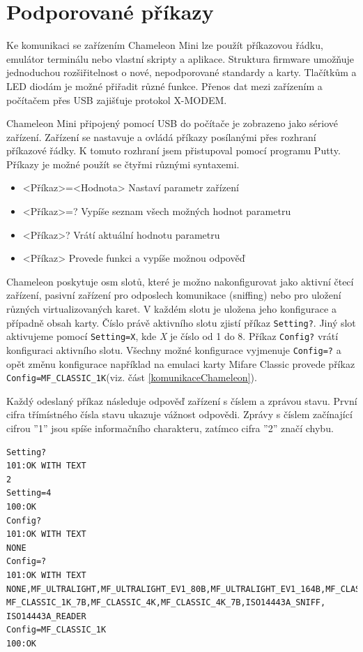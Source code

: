 \section{Podporované příkazy}
Ke komunikaci se zařízením Chameleon Mini lze použít příkazovou řádku, emulátor terminálu nebo vlastní skripty a aplikace. Struktura firmware umožňuje jednoduchou rozšiřitelnost o nové, nepodporované standardy a karty. Tlačítkům a LED diodám je možné přiřadit různé funkce. Přenos dat mezi zařízením a počítačem přes USB zajišťuje protokol {X-MODEM}. \cite{ChameleonKickStarter}
\par
Chameleon Mini připojený pomocí USB do počítače je zobrazeno jako sériové zařízení. Zařízení se nastavuje a ovládá příkazy posílanými přes rozhraní příkazové řádky. K tomuto rozhraní jsem přistupoval pomocí programu Putty. Příkazy je možné použít se čtyřmi různými syntaxemi.
\begin{itemize}
  \item <Příkaz>=<Hodnota> Nastaví parametr zařízení
  \item <Příkaz>=? Vypíše seznam všech možných hodnot parametru
  \item <Příkaz>? Vrátí aktuální hodnotu parametru
  \item <Příkaz> Provede funkci a vypíše možnou odpověď
\end{itemize}
Chameleon poskytuje osm slotů, které je možno nakonfigurovat jako aktivní čtecí zařízení, pasivní zařízení pro odposlech komunikace (sniffing) nebo pro uložení různých virtualizovaných karet. V každém slotu je uložena jeho konfigurace a případně obsah karty. Číslo právě aktivního slotu zjistí příkaz \verb|Setting?|. Jiný slot aktivujeme pomocí \verb|Setting=X|, kde \emph{X} je číslo od 1 do 8. Příkaz \verb|Config?| vrátí konfiguraci aktivního slotu. Všechny možné konfigurace vyjmenuje \verb|Config=?| a opět změnu konfigurace například na emulaci karty Mifare Classic provede příkaz \verb|Config=MF_CLASSIC_1K|(viz. část \ref{komunikaceChameleon}). \par 
Každý odeslaný příkaz následuje odpověď zařízení s číslem a zprávou stavu. První cifra třímístného čísla stavu ukazuje vážnost odpovědi. Zprávy s číslem začínající cifrou ''1'' jsou spíše informačního charakteru, zatímco cifra ''2'' značí chybu.\cite{ChameleonDocs}

\begin{lstlisting}[caption=Záznam komunikace se zařízením Chameleon Mini, label={komunikaceChameleon}]
Setting?
101:OK WITH TEXT
2
Setting=4
100:OK
Config?
101:OK WITH TEXT
NONE
Config=?
101:OK WITH TEXT
NONE,MF_ULTRALIGHT,MF_ULTRALIGHT_EV1_80B,MF_ULTRALIGHT_EV1_164B,MF_CLASSIC_1K,
MF_CLASSIC_1K_7B,MF_CLASSIC_4K,MF_CLASSIC_4K_7B,ISO14443A_SNIFF,
ISO14443A_READER
Config=MF_CLASSIC_1K
100:OK
\end{lstlisting}

